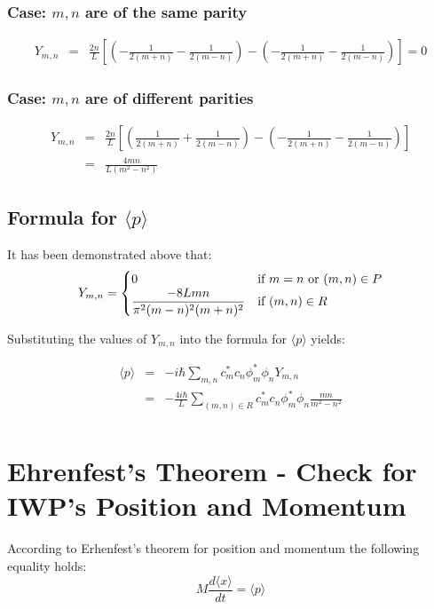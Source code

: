 \documentclass[12pt]{article}
\begin{document}
\subsubsection{Case: $m, n$ are of the same parity}
\begin{eqnarray*}
Y_{m, n} &=& \frac{2n}{L}
				\left[
							 \left( 	-\frac{1}{2(m+n)} - \frac{1}{2(m-n)}	\right)  - 
					\left( 	-\frac{1}{2(m+n)} - \frac{1}{2(m-n)}	\right)				
				\right] = 0
\end{eqnarray*}

\subsubsection{Case: $m, n$ are of different parities}
\begin{eqnarray*}
Y_{m, n} &=& \frac{2n}{L}
		\left[
		 \left( 	\frac{1}{2(m+n)} + \frac{1}{2(m-n)}	\right)  - 
				\left( 	-\frac{1}{2(m+n)} - \frac{1}{2(m-n)}	\right)
				\right] \\
		&=& \frac{4 m n}{L(m^2 - n^2)}
\end{eqnarray*}

\subsection{Formula for $\langle p \rangle$}
It has been demonstrated above that:
\begin{equation}
Y_{m, n} = 
\begin{cases} 
\displaystyle 0  & \text{if $ m=n $ or $ (m,n) \in P $} \\ 
\displaystyle \frac{-8Lmn}{\pi^2(m-n)^2 (m+n)^2} & \text{if $(m, n) \in R$} 
\end{cases}
\end{equation}

\noindent Substituting the values of $Y_{m, n}$ into the formula for $\langle p \rangle$ yields:

\begin{eqnarray*}
\langle p \rangle &=&  - i \hbar \sum_{m,n} c_m^* c_n \phi^*_m \phi_n Y_{m, n} \\
		&=& - \frac{4 i \hbar}{L}  \sum_{(m,n) \in R} c_m^* c_n \phi^*_m \phi_n \frac{ m n}{m^2 - n^2} \\
\end{eqnarray*}



\section{Ehrenfest's Theorem - Check for IWP's Position and Momentum}
According to Erhenfest's theorem for position and momentum the following equality holds:
\begin{equation}
\label{ehrenfest_theorem_case_position_and_momentum}
M \frac{d \langle x \rangle }{dt} = \langle p \rangle
\end{equation}
\end{document}
